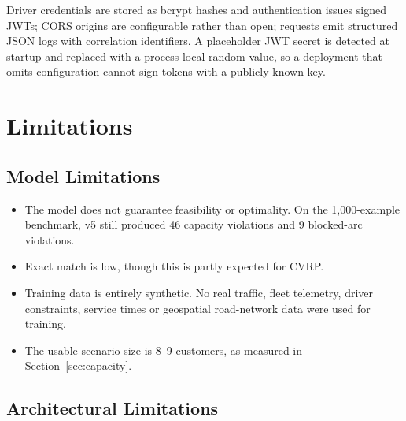 \documentclass[11pt,a4paper]{article}
\begin{document}
Driver credentials are stored as bcrypt hashes and authentication issues signed JWTs; CORS origins
are configurable rather than open; requests emit structured JSON logs with correlation identifiers.
A placeholder JWT secret is detected at startup and replaced with a process-local random value, so a
deployment that omits configuration cannot sign tokens with a publicly known key.

\section{Limitations}
\label{sec:limitations}

\subsection{Model Limitations}

\begin{itemize}
  \item The model does not guarantee feasibility or optimality. On the 1,000-example benchmark, v5
        still produced 46 capacity violations and 9 blocked-arc violations.
  \item Exact match is low, though this is partly expected for CVRP.
  \item Training data is entirely synthetic. No real traffic, fleet telemetry, driver constraints,
        service times or geospatial road-network data were used for training.
  \item The usable scenario size is 8--9 customers, as measured in Section~\ref{sec:capacity}.
\end{itemize}

\subsection{Architectural Limitations}
\end{document}
